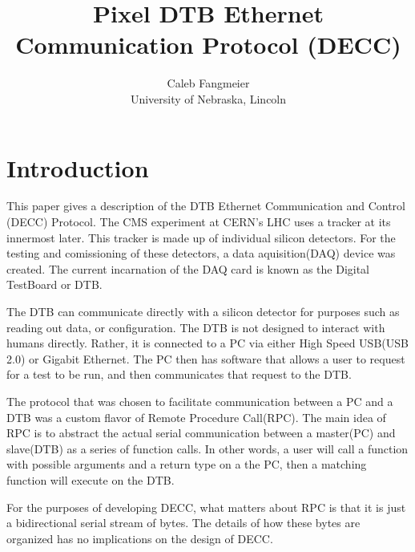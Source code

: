 \documentclass{article}
\title{Pixel DTB Ethernet Communication Protocol (DECC)}
\author{Caleb Fangmeier \\ University of Nebraska, Lincoln}
\begin{document}
\maketitle
\tableofcontents

\section{Introduction}
This paper gives a description of the DTB Ethernet Communication and Control (DECC) Protocol. The CMS experiment at CERN's LHC uses a tracker at its innermost later. This tracker is made up of individual silicon detectors. For the testing and comissioning of these detectors, a data aquisition(DAQ) device was created. The current incarnation of the DAQ card is known as the Digital TestBoard or DTB. 

The DTB can communicate directly with a silicon detector for purposes such as reading out data, or configuration. The DTB is not designed to interact with humans directly. Rather, it is connected to a PC via either High Speed USB(USB 2.0) or Gigabit Ethernet. The PC then has software that allows a user to request for a test to be run, and then communicates that request to the DTB. 

The protocol that was chosen to facilitate communication between a PC and a DTB was a custom flavor of Remote Procedure Call(RPC). The main idea of RPC is to abstract the actual serial communication between a master(PC) and slave(DTB) as a series of function calls. In other words, a user will call a function with possible arguments and a return type on a the PC, then a matching function will execute on the DTB. 

For the purposes of developing DECC, what matters about RPC is that it is just a bidirectional serial stream of bytes. The details of how these bytes are organized has no implications on the design of DECC. 
\end{document}
